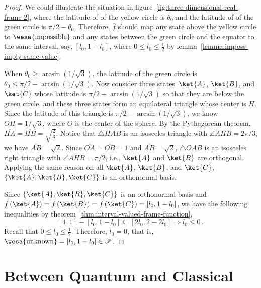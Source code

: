 \documentclass[12pt]{iopart}
\theoremstyle{plain}
\theoremstyle{definition}
\theoremstyle{remark}
\newcommand{\imposs}{{\mbox{\wesa{impossible}}}}
\newcommand{\unknown}{{\mbox{\wesa{unknown}}}}
\begin{document}
\begin{proof}
We could illustrate the situation in figure~\ref{fig:three-dimensional-real-frame-2},
where the latitude of of the yellow circle is $\theta_{0}$ and the
latitude of of the green circle is $\pi / 2-\theta_{0}$. Therefore,
$\bar{f}$ should map any state above the yellow circle to $\imposs$
and any states between the green circle and the equator to the same
interval, say, $\left[l_{0},1-l_{0}\right]$, where $0\le l_{0}\le\frac{1}{2}$
by lemma~\ref{lemma:imposs-imply-same-value}.

When $\theta_{0}\ge\arcsin\left(1 / \sqrt{3}\right)$, the latitude
of the green circle is $\theta_{0}\le\pi / 2-\arcsin\left(1 / \sqrt{3}\right)$.
Now consider three states~$\ket{A}$, $\ket{B}$, and $\ket{C}$
whose latitude is $\pi / 2-\arcsin\left(1 / \sqrt{3}\right)$
so that they are below the green circle, and these three states form
an equilateral triangle whose center is $H$. Since the latitude of
this triangle is $\pi / 2-\arcsin\left(1 / \sqrt{3}\right)$,
we know $\overline{OH}=1 / \sqrt{3}$, where $O$ is the center
of the sphere. By the Pythagorean theorem, $\overline{HA}=\overline{HB}=\sqrt{\frac{2}{3}}$.
Notice that $\triangle HAB$ is an isosceles triangle with $\angle AHB=2\pi / 3$,
we have $\overline{AB}=\sqrt{2}$. Since $\overline{OA}=\overline{OB}=1$
and $\overline{AB}=\sqrt{2}$, $\triangle OAB$ is an isosceles right
triangle with $\angle AHB=\pi / 2$, i.e., $\ket{A}$ and $\ket{B}$
are orthogonal. Applying the same reason on all $\ket{A}$, $\ket{B}$,
and $\ket{C}$, $\left\{ \ket{A},\ket{B},\ket{C}\right\} $ is an
orthonormal basis.

Since $\left\{ \ket{A},\ket{B},\ket{C}\right\} $ is an orthonormal
basis and $\bar{f}\left(\ket{A}\right)=\bar{f}\left(\ket{B}\right)=\bar{f}\left(\ket{C}\right)=\left[l_{0},1-l_{0}\right]$,
we have the following inequalities by theorem~\ref{thm:interval-valued-frame-function},
\begin{equation}
\left[1,1\right]-\left[l_{0},1-l_{0}\right]\subseteq\left[2l_{0},2-2l_{0}\right]\Rightarrow l_{0}\le0\,.
\end{equation}
Recall that $0\le l_{0}\le\frac{1}{2}$. Therefore, $l_{0}=0$, that
is, $\unknown=\left[l_{0},1-l_{0}\right]\in\mathscr{I}$. \end{proof}

\section{Between Quantum and Classical}
\end{document}
